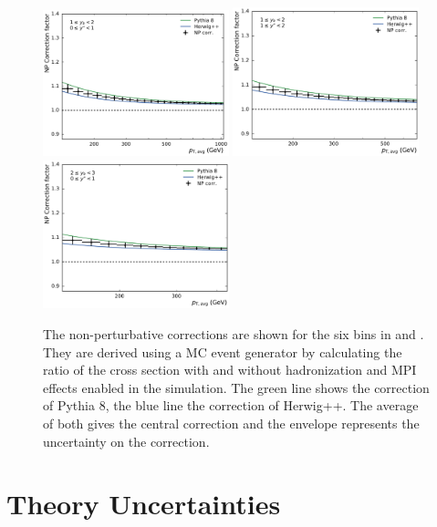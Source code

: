 \begin{figure}[htp]
    \includegraphics[width=0.48\textwidth]{figures/theory/np_factors_calc_yb1ys0.pdf}
    \includegraphics[width=0.48\textwidth]{figures/theory/np_factors_calc_yb1ys1.pdf}\hfill
    \includegraphics[width=0.48\textwidth]{figures/theory/np_factors_calc_yb2ys0.pdf}
    \caption[Non-perturbative corrections]{The non-perturbative corrections are
        shown for the six bins in \ystar and \yboost. They are derived using a MC event
        generator by calculating the ratio of the cross section with and without
        hadronization and MPI effects enabled in the simulation. The green line
        shows the correction of Pythia 8, the blue line the correction of
    Herwig++. The average of both gives the central correction and the envelope
represents the uncertainty on the correction.}
    \label{fig:np_factors}
\end{figure}

\section{Theory Uncertainties}

